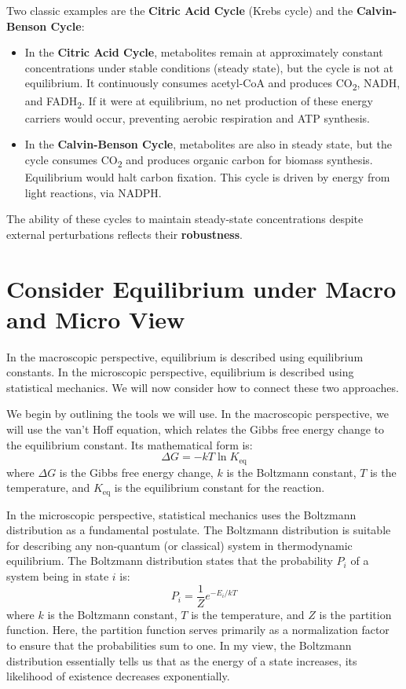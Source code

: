 \documentclass[12pt]{article}
\begin{document}
Two classic examples are the \textbf{Citric Acid Cycle} (Krebs cycle) and the \textbf{Calvin-Benson Cycle}:

\begin{itemize}
\item In the \textbf{Citric Acid Cycle}, metabolites remain at approximately constant concentrations under stable conditions (steady state), but the cycle is not at equilibrium. It continuously consumes acetyl-CoA and produces CO\textsubscript{2}, NADH, and FADH\textsubscript{2}. If it were at equilibrium, no net production of these energy carriers would occur, preventing aerobic respiration and ATP synthesis.

\item In the \textbf{Calvin-Benson Cycle}, metabolites are also in steady state, but the cycle consumes CO\textsubscript{2} and produces organic carbon for biomass synthesis. Equilibrium would halt carbon fixation. This cycle is driven by energy from light reactions, via NADPH.
\end{itemize}

The ability of these cycles to maintain steady-state concentrations despite external perturbations reflects their \textbf{robustness}.

\section{Consider Equilibrium under Macro and Micro View}
In the macroscopic perspective, equilibrium is described using equilibrium constants. In the microscopic perspective, equilibrium is described using statistical mechanics. We will now consider how to connect these two approaches.

We begin by outlining the tools we will use. In the macroscopic perspective, we will use the van't Hoff equation, which relates the Gibbs free energy change to the equilibrium constant. Its mathematical form is:
\begin{equation}
    \Delta G = -kT \ln K_{\text{eq}}
\end{equation}
where $\Delta G$ is the Gibbs free energy change, $k$ is the Boltzmann constant, $T$ is the temperature, and $K_{\text{eq}}$ is the equilibrium constant for the reaction.

In the microscopic perspective, statistical mechanics uses the Boltzmann distribution as a fundamental postulate. The Boltzmann distribution is suitable for describing any non-quantum (or classical) system in thermodynamic equilibrium. The Boltzmann distribution states that the probability $P_i$ of a system being in state $i$ is:
\begin{equation}
    P_i = \frac{1}{Z} e^{-E_i / kT}
\end{equation}
where $k$ is the Boltzmann constant, $T$ is the temperature, and $Z$ is the partition function. Here, the partition function serves primarily as a normalization factor to ensure that the probabilities sum to one. In my view, the Boltzmann distribution essentially tells us that as the energy of a state increases, its likelihood of existence decreases exponentially.
\end{document}
